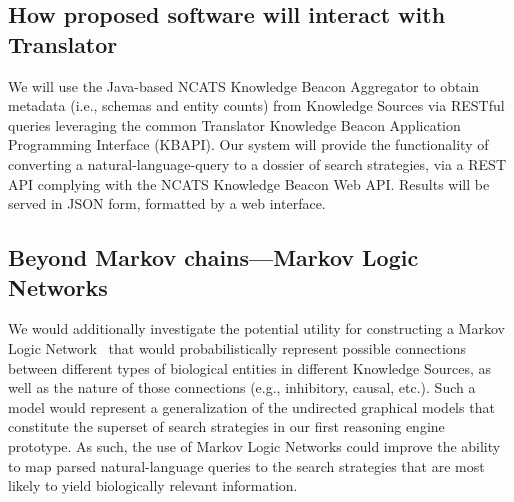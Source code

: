\documentclass[11pt,notitlepage]{article}
\begin{document}

\vspace{-2ex}
\subsection{How proposed software will interact with Translator}
\label{sec:interact}
We will use the Java-based NCATS Knowledge Beacon Aggregator to obtain metadata
(i.e., schemas and entity counts) from Knowledge Sources via RESTful queries
leveraging the common Translator Knowledge Beacon Application Programming
Interface (KBAPI). Our system will provide the functionality of converting a
natural-language-query to a dossier of search strategies, via a REST API
complying with the NCATS Knowledge Beacon Web API. Results will be served in JSON form, formatted by a web interface.

\vspace{-2ex}
\subsection{Beyond Markov chains---Markov Logic Networks}
We would additionally investigate the potential utility for constructing a
Markov Logic Network~\cite{Domingos:2012wi,domingos20071} that would
probabilistically represent possible connections between different types of
biological entities in different Knowledge Sources, as well as the nature of
those connections (e.g., inhibitory, causal, etc.). Such a model would represent
a generalization of the undirected graphical models that constitute the superset
of search strategies in our first reasoning engine prototype. As such, the use
of Markov Logic Networks could improve the ability to map parsed
natural-language queries to the search strategies that are most likely to yield
biologically relevant information.
\end{document}
